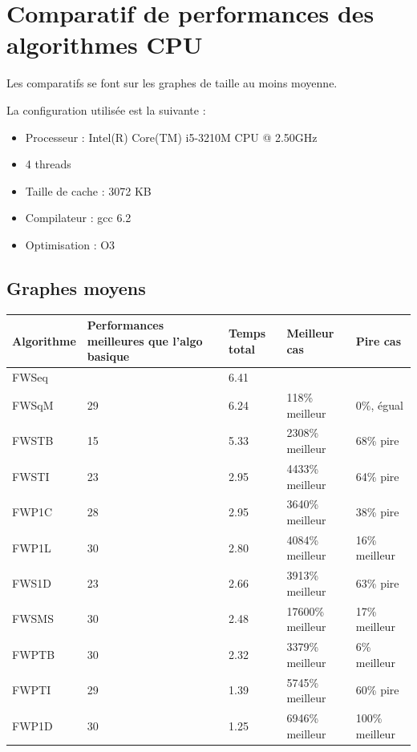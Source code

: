 \documentclass[a4paper,11pt]{article}
\begin{document}
\section{Comparatif de performances des algorithmes CPU}

Les comparatifs se font sur les graphes de taille au moins moyenne.

La configuration utilisée est la suivante :

\begin{itemize}
  \item Processeur : Intel(R) Core(TM) i5-3210M CPU @ 2.50GHz
  \item 4 threads
  \item Taille de cache : 3072 KB
  \item Compilateur : gcc 6.2
  \item Optimisation : O3
\end{itemize}

\subsection{Graphes moyens}

\begin{center}
  \begin{tabular}{p{2cm} | p{4.5cm} | p{2cm} | p{3cm} | p{3cm}}
    \centering \textbf{Algorithme} & \centering \textbf {Performances meilleures que l'algo basique} & \centering \textbf{Temps total} & \centering \textbf{Meilleur cas} & \centering \textbf{Pire cas} \tabularnewline
    \hline
    FWSeq & & 6.41 & & \\
    \hline
    \hline
    FWSqM & 29 & 6.24 & 118\% meilleur & 0\%, égual \\
    \hline
    FWSTB & 15 & 5.33 & 2308\% meilleur & 68\% pire \\
    \hline
    FWSTI & 23 & 2.95 & 4433\% meilleur & 64\% pire \\
    \hline
    FWP1C & 28 & 2.95 & 3640\% meilleur & 38\% pire \\
    \hline
    FWP1L & 30 & 2.80 & 4084\% meilleur & 16\% meilleur \\
    \hline
    FWS1D & 23 & 2.66 & 3913\% meilleur & 63\% pire \\
    \hline
    FWSMS & 30 & 2.48 & 17600\% meilleur & 17\% meilleur \\
    \hline
    FWPTB & 30 & 2.32 & 3379\% meilleur & 6\% meilleur \\
    \hline
    FWPTI & 29 & 1.39 & 5745\% meilleur & 60\% pire \\
    \hline
    FWP1D & 30 & 1.25 & 6946\% meilleur & 100\% meilleur \\
    \hline
  \end{tabular}
\end{center}
\end{document}
